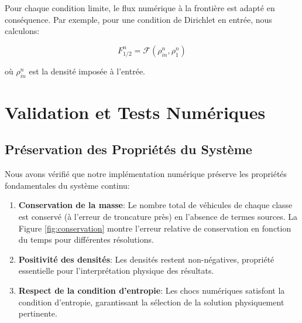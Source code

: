 Pour chaque condition limite, le flux numérique à la frontière est adapté en conséquence. Par exemple, pour une condition de Dirichlet en entrée, nous calculons:

\begin{equation}
F_{1/2}^n = \mathcal{F}(\rho_{in}^n, \rho_1^n)
\end{equation}

où $\rho_{in}^n$ est la densité imposée à l'entrée.

\section{Validation et Tests Numériques}
\label{sec:validation_tests}

\subsection{Préservation des Propriétés du Système}
\label{subsec:preservation_proprietes}

Nous avons vérifié que notre implémentation numérique préserve les propriétés fondamentales du système continu:

\begin{enumerate}
\item \textbf{Conservation de la masse}: Le nombre total de véhicules de chaque classe est conservé (à l'erreur de troncature près) en l'absence de termes sources. La Figure \ref{fig:conservation} montre l'erreur relative de conservation en fonction du temps pour différentes résolutions.

\item \textbf{Positivité des densités}: Les densités restent non-négatives, propriété essentielle pour l'interprétation physique des résultats.

\item \textbf{Respect de la condition d'entropie}: Les chocs numériques satisfont la condition d'entropie, garantissant la sélection de la solution physiquement pertinente.
\end{enumerate}

